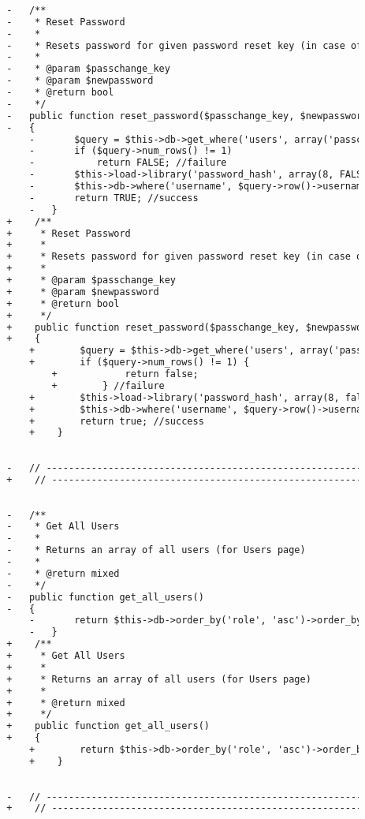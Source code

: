 \begin{lstlisting}[language=diff, caption=Perubahan pada kode User\_model.php]
		
		-	/**
		-	 * Reset Password
		-	 *
		-	 * Resets password for given password reset key (in case of lost password)
		-	 *
		-	 * @param $passchange_key
		-	 * @param $newpassword
		-	 * @return bool
		-	 */
		-	public function reset_password($passchange_key, $newpassword)
		-	{
			-		$query = $this->db->get_where('users', array('passchange_key'=>$passchange_key));
			-		if ($query->num_rows() != 1)
			-			return FALSE; //failure
			-		$this->load->library('password_hash', array(8, FALSE));
			-		$this->db->where('username', $query->row()->username)->update('users', array('passchange_key'=>'', 'password' => $this->password_hash->HashPassword($newpassword)));
			-		return TRUE; //success
			-	}
		+    /**
		+     * Reset Password
		+     *
		+     * Resets password for given password reset key (in case of lost password)
		+     *
		+     * @param $passchange_key
		+     * @param $newpassword
		+     * @return bool
		+     */
		+    public function reset_password($passchange_key, $newpassword)
		+    {
			+        $query = $this->db->get_where('users', array('passchange_key' => $passchange_key));
			+        if ($query->num_rows() != 1) {
				+            return false;
				+        } //failure
			+        $this->load->library('password_hash', array(8, false));
			+        $this->db->where('username', $query->row()->username)->update('users', array('passchange_key' => '', 'password' => $this->password_hash->HashPassword($newpassword)));
			+        return true; //success
			+    }
		
		
		-	// ------------------------------------------------------------------------
		+    // ------------------------------------------------------------------------
		
		
		-	/**
		-	 * Get All Users
		-	 *
		-	 * Returns an array of all users (for Users page)
		-	 *
		-	 * @return mixed
		-	 */
		-	public function get_all_users()
		-	{
			-		return $this->db->order_by('role', 'asc')->order_by('id')->get('users')->result_array();
			-	}
		+    /**
		+     * Get All Users
		+     *
		+     * Returns an array of all users (for Users page)
		+     *
		+     * @return mixed
		+     */
		+    public function get_all_users()
		+    {
			+        return $this->db->order_by('role', 'asc')->order_by('id')->get('users')->result_array();
			+    }
		
		
		-	// ------------------------------------------------------------------------
		+    // ------------------------------------------------------------------------
		

\end{lstlisting}
